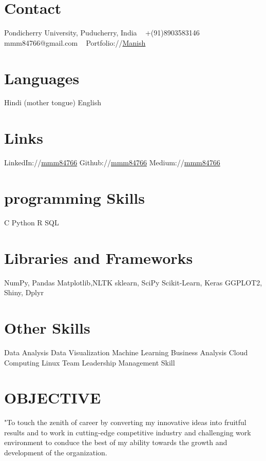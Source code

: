 \documentclass[]{cv-style}          %
\begin{document}



\begin{aside}
%
\section{Contact}
Pondicherry University,
Puducherry, India
~
+(91)8903583146
~
mmm84766@gmail.com
~
Portfolio://\href{http://jupyter.me/}{Manish}
~
%
\section{Languages}
Hindi (mother tongue)
English 
\section{Links} 
LinkedIn://\href{https://www.linkedin.com/in/mmm84766}{mmm84766}
Github://\href{https://github.com/mmm84766}{mmm84766} 
Medium://\href{https://medium.com/@manishkumar_72360}{mmm84766} 
\section{programming Skills}
C
Python
R
SQL
%
\section{Libraries and Frameworks}
NumPy, Pandas
Matplotlib,NLTK
sklearn, SciPy
Scikit-Learn, Keras
GGPLOT2, Shiny, Dplyr
\section{Other Skills}
Data Analysis
Data Visualization
Machine Learning 
Business Analysis
Cloud Computing
Linux
Team Leadership
Management Skill
{}
%
\end{aside}
\section{OBJECTIVE}
  \vspace{-0.2cm}
"To touch the zenith of career by converting my innovative ideas into fruitful results and to work in cutting-edge competitive industry and challenging work  environment to conduce the best of my ability towards the growth and development of the organization.
%
\end{document}
